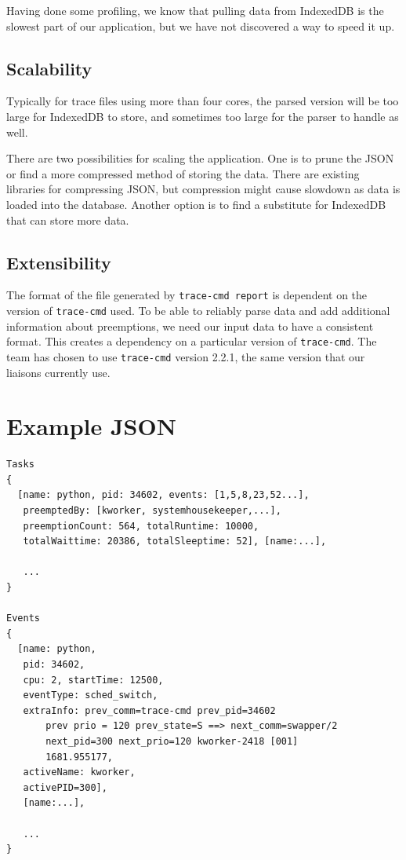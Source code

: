 \documentclass{hmcclinic}
\begin{document}
Having done some profiling, we know that pulling data from IndexedDB is the
slowest part of our application, but we have not discovered a way to speed it up.

\section{Scalability}
Typically for trace files using more than four
cores, the parsed version will be too large for IndexedDB to store, and
sometimes too large for the parser to handle as well.

There are two possibilities for scaling the application. One is to prune the JSON or
find a more compressed method of storing the data. There are existing libraries
for compressing JSON, but compression might cause slowdown as data is
 loaded into the database.
Another option is to find a substitute for IndexedDB that can store more data.

\section{Extensibility}
  The format of the file generated by \texttt{trace-cmd
  report} is dependent on the version of \texttt{trace-cmd} used. To be able to reliably
  parse data and add additional information about preemptions, we need our input
  data to have a consistent format. This creates a dependency on a particular
  version of \texttt{trace-cmd}. The team has chosen to use \texttt{trace-cmd} version 2.2.1, 
  the same version that our liaisons currently use.

\newpage
\let\cleardoublepage\clearpage
\appendix
\renewcommand{\thechapter}{\Alph{chapter}}
\chapter{Example JSON} \label{App:AppendixA}

\begin{verbatim}
Tasks
{
  [name: python, pid: 34602, events: [1,5,8,23,52...], 
   preemptedBy: [kworker, systemhousekeeper,...], 
   preemptionCount: 564, totalRuntime: 10000,
   totalWaittime: 20386, totalSleeptime: 52], [name:...],

   ...   
}

Events
{
  [name: python, 
   pid: 34602, 
   cpu: 2, startTime: 12500, 
   eventType: sched_switch,
   extraInfo: prev_comm=trace-cmd prev_pid=34602 
       prev prio = 120 prev_state=S ==> next_comm=swapper/2 
       next_pid=300 next_prio=120 kworker-2418 [001]
       1681.955177, 
   activeName: kworker, 
   activePID=300], 
   [name:...], 

   ...
}
\end{verbatim}
\end{document}
